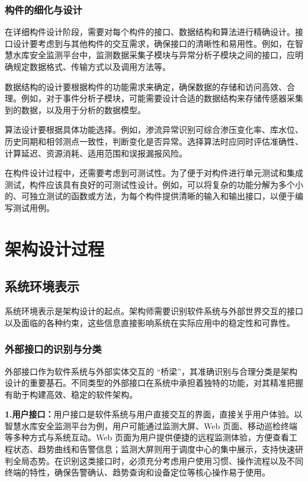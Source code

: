 \subsubsection{构件的细化与设计}
在详细构件设计阶段，需要对每个构件的接口、数据结构和算法进行精确设计。接口设计要考虑到与其他构件的交互需求，确保接口的清晰性和易用性。例如，在智慧水库安全监测平台中，监测数据采集子模块与异常分析子模块之间的接口，应明确规定数据格式、传输方式以及调用方法等。

数据结构的设计要根据构件的功能需求来确定，确保数据的存储和访问高效、合理。例如，对于事件分析子模块，可能需要设计合适的数据结构来存储传感器采集到的数据，以及用于分析的数据模型。

算法设计要根据具体功能选择。例如，渗流异常识别可综合渗压变化率、库水位、历史同期和相邻测点一致性，判断变化是否异常。选择算法时应同时评估准确性、计算延迟、资源消耗、适用范围和误报漏报风险。

在构件设计过程中，还需要考虑到可测试性。为了便于对构件进行单元测试和集成测试，构件应该具有良好的可测试性设计。例如，可以将复杂的功能分解为多个小的、可独立测试的函数或方法，为每个构件提供清晰的输入和输出接口，以便于编写测试用例。

\section{架构设计过程}

\subsection{系统环境表示}

系统环境表示是架构设计的起点。架构师需要识别软件系统与外部世界交互的接口以及面临的各种约束，这些信息直接影响系统在实际应用中的稳定性和可靠性。

\subsubsection{外部接口的识别与分类}
外部接口作为软件系统与外部实体交互的 “桥梁”，其准确识别与合理分类是架构设计的重要基石。不同类型的外部接口在系统中承担着独特的功能，对其精准把握有助于构建高效、稳定的软件架构。

\textbf{1.用户接口：}用户接口是软件系统与用户直接交互的界面，直接关乎用户体验。以智慧水库安全监测平台为例，用户可能通过监测大屏、Web 页面、移动巡检终端等多种方式与系统互动。Web 页面为用户提供便捷的远程监测体验，方便查看工程状态、趋势曲线和告警信息；监测大屏则用于调度中心的集中展示，支持快速研判全局态势。在识别这类接口时，必须充分考虑用户使用习惯、操作流程以及不同终端的特性，确保告警确认、趋势查询和设备定位等核心操作易于使用。

